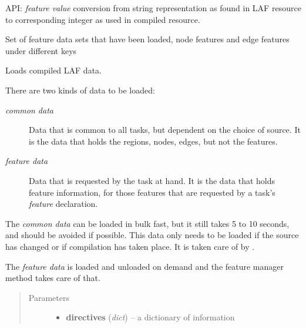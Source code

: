 \documentclass[letterpaper,10pt,english]{sphinxmanual}
\begin{document}
\begin{fulllineitems}

\begin{fulllineitems}
\label{graf/graf:graf.task.GrafTask.int_fval}
API: \emph{feature value} conversion from string representation as found in LAF resource
to corresponding integer as used in compiled resource.

\end{fulllineitems}


\begin{fulllineitems}
\label{graf/graf:graf.task.GrafTask.loaded}
Set of feature data sets that have been loaded, node features and edge features under different keys

\end{fulllineitems}


\begin{fulllineitems}
\label{graf/graf:graf.task.GrafTask.loader}
Loads compiled LAF data.

There are two kinds of data to be loaded:
\begin{description}
\item[{\emph{common data}}] \leavevmode
Data that is common to all tasks, but dependent on the choice of source.
It is the data that holds the regions, nodes, edges, but not the features.

\item[{\emph{feature data}}] \leavevmode
Data that is requested by the task at hand.
It is the data that holds feature information,
for those features that are requested by a task's \emph{feature} declaration.

\end{description}

The \emph{common data} can be loaded in bulk fast, but it still takes 5 to 10 seconds,
and should be avoided if possible.
This data only needs to be loaded if the source has changed or if compilation has taken place.
It is taken care of by {\hyperref[graf/graf:graf.task.GrafTask.common_loader]{}}.

The \emph{feature data} is loaded and unloaded on demand
and the feature manager method {\hyperref[graf/graf:graf.task.GrafTask.feature_loader]{}} takes care of that.
\begin{quote}\begin{description}
\item[{Parameters}] \leavevmode\begin{itemize}
\item {} 
\textbf{directives} (\emph{dict}) --
a dictionary of information


\end{itemize}
\end{description}
\end{quote}
\end{fulllineitems}
\end{fulllineitems}
\end{document}

